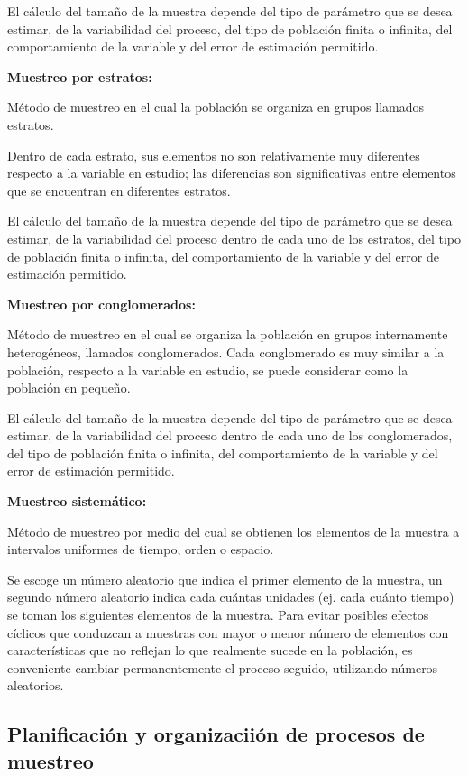 \documentclass[a5paper,doc,10pt,noapacite]{apa6}
\newcommand{\neodefi}[1]{%
	\vspace{1\baselineskip}
	\textbf{\small#1} \newline
}
\begin{document}
{{	El cálculo del tamaño de la muestra depende del tipo de parámetro que se desea estimar, de la variabilidad del proceso, del tipo de población finita o infinita, del comportamiento de la variable y del error de estimación permitido.
	
\neodefi{Muestreo por estratos:}
	Método de muestreo en el cual la población se organiza en grupos llamados estratos. 
	
	Dentro de cada estrato, sus elementos no son relativamente muy diferentes respecto a la variable en estudio; las diferencias son significativas entre elementos que se encuentran en diferentes estratos.
	
	El cálculo del tamaño de la muestra depende del tipo de parámetro que se desea estimar, de la variabilidad del proceso dentro de cada uno de los estratos, del tipo de población finita o infinita, del comportamiento de la variable y del error de estimación permitido. 
	
\neodefi{Muestreo por conglomerados:}
	Método de muestreo en el cual se organiza la población en grupos internamente heterogéneos, llamados conglomerados. Cada conglomerado es muy similar a la  población, respecto a la variable en estudio, se puede considerar como la población en pequeño.
	
	El cálculo del tamaño de la muestra depende del tipo de parámetro que se desea estimar, de la variabilidad del proceso dentro de cada uno de los conglomerados, del tipo de población finita o infinita, del comportamiento de la variable y del error de estimación permitido.
	
\neodefi{Muestreo sistemático:}
	Método de muestreo por medio del cual se obtienen los elementos de la muestra a intervalos uniformes de tiempo, orden o espacio.
	
	Se escoge un número aleatorio que indica el primer elemento de la muestra, un segundo número aleatorio indica cada cuántas unidades (ej. cada cuánto tiempo) se toman los siguientes elementos de la muestra. Para evitar posibles efectos cíclicos que conduzcan a muestras con mayor o menor número de elementos con características que no reflejan lo que realmente sucede en la población, es conveniente cambiar permanentemente el proceso seguido, utilizando números aleatorios.
	



%
\subsection{Planificación y organizaciión de procesos de muestreo}
	
}}
\end{document}

